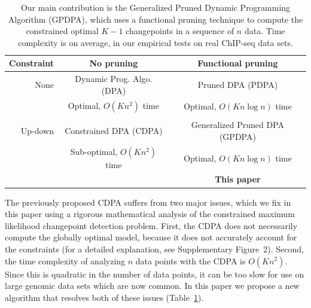 \documentclass[twoside,11pt]{article}
\begin{document}

\begin{table}[t!]
  \centering
  \begin{tabular}{r|c|c}
    Constraint & No pruning & Functional pruning \\
    \hline
    None & Dynamic Prog. Algo. (DPA) & Pruned DPA (PDPA) \\
    & Optimal, $O(Kn^2)$ time & Optimal, $O(Kn\log n)$ time\\
    & \citet{segment-neighborhood}     & \citet{pruned-dp, phd-johnson} \\
    \hline
    Up-down & Constrained DPA (CDPA) & Generalized Pruned DPA (GPDPA) \\
    & Sub-optimal, $O(Kn^2)$ time & Optimal, $O(Kn\log n)$ time\\
    & \citet{HOCKING-PeakSeg} & \textbf{This paper} \\
    \hline
  \end{tabular}
  \caption{Our main contribution is 
the Generalized Pruned Dynamic Programming Algorithm (GPDPA), 
 which uses a functional pruning technique 
    to compute the constrained optimal $K-1$ changepoints 
in a sequence of $n$ data. 
Time complexity is on average, 
in our empirical tests on real ChIP-seq data sets.}
\label{tab:contribution}
\end{table}

The previously proposed CDPA suffers from two major issues, which we fix in
this paper using a rigorous mathematical analysis of the constrained
maximum likelihood changepoint detection problem. First, the CDPA does
not necessarily compute the globally optimal model, because it does
not accurately account for the constraints (for a detailed
explanation, see Supplementary Figure~2). Second, the time complexity
of analyzing $n$ data points with the CDPA is $O(Kn^2)$. Since this is quadratic in the number of
data points, it can be too slow for use on large genomic data sets
which are now common. In this paper we propose a new algorithm that
resolves both of these issues (Table~\ref{tab:contribution}).
\end{document}
